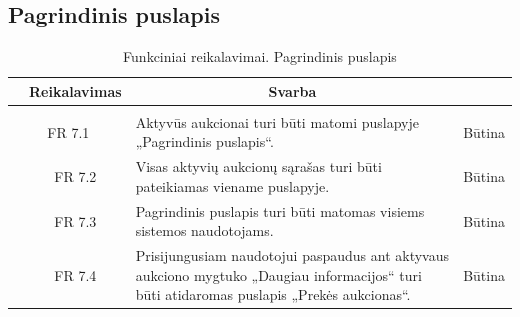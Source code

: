\documentclass{VUMIFPSkursinis}
\begin{document}
\subsection{Pagrindinis puslapis}
\begin{table}[H]
	\caption{Funkciniai reikalavimai. Pagrindinis puslapis}
	\begin{tabular}{|p{1cm}|p{1cm}|p{}|p{}|}
		\hline 
		\rowcolor{gray!50}
		\multicolumn{2}{|c|}{{\bfseries Kodas}}&
		\multicolumn{1}{c|}{{\bfseries Reikalavimas}}&
		\multicolumn{1}{c|}{{\bfseries Svarba}}\\
		\hline
		\rowcolor{lightgray}
		\multicolumn{4}{|c|}{Pagrindinis puslapis}\\		
		
		\hline
		\multicolumn{2}{|c|}{FR 7.1}&
		{Aktyvūs aukcionai turi būti matomi puslapyje „Pagrindinis puslapis“.
		}&		
		\multicolumn{1}{c|}{Būtina}\\
		\hline
		\multicolumn{1}{|c}{}&
		\multicolumn{1}{c|}{FR 7.2}&
		{Visas aktyvių aukcionų sąrašas turi būti pateikiamas viename puslapyje.
		}&		
		\multicolumn{1}{c|}{Būtina}\\
		\hline	
		\multicolumn{1}{|c}{}&
		\multicolumn{1}{c|}{FR 7.3}&
		{Pagrindinis puslapis turi būti matomas visiems sistemos naudotojams.
		}&
		\multicolumn{1}{c|}{Būtina}\\									
		\hline
		\multicolumn{1}{|c}{}&
		\multicolumn{1}{c|}{FR 7.4}&
		{Prisijungusiam naudotojui paspaudus ant aktyvaus aukciono mygtuko „Daugiau informacijos“ turi būti atidaromas puslapis „Prekės aukcionas“.
		}&
		\multicolumn{1}{c|}{Būtina}\\									
		\hline
	\end{tabular}		
\end{table}
\end{document}
